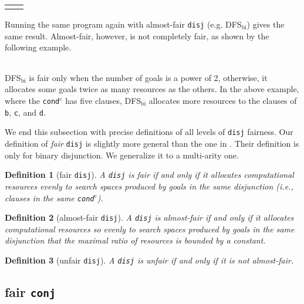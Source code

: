\documentclass[format=acmlarge, review=true, authordraft=true]{acmart}
\newcommand{\conde}{\texttt{cond$^e$}}
\newcommand{\disj}{\texttt{disj}}
\newcommand{\DFSbi}[0]{DFS$_\textrm{bi}$}
\newtheorem{defn}{Definition}[section]
\begin{document}
\begin{center}
	\begin{tabular}{l|r}
		 &
		
	\end{tabular}
\end{center}

Running the same program again with almost-fair \disj {} (e.g. 
\DFSbi{}) gives the same result. Almost-fair, however, is not 
completely fair, as shown by the following example. 

\begin{center}
	\begin{tabular}{c}
		
	\end{tabular}
\end{center}

\DFSbi{} is fair only when the number of goals is a power of 2, 
otherwise, it allocates some goals twice as many resources as the 
others. In the above example, where the \conde{} has five clauses, \DFSbi{} 
allocates more resources to the clauses of \texttt{b}, \texttt{c}, and 
\texttt{d}.

We end this subsection with precise definitions of all levels of 
\disj{} fairness. Our definition of \emph{fair} \disj{} is slightly 
more general
than the one in \citet{seres1999algebra}. Their definition is only
for binary disjunction. We generalize it to a multi-arity one.

\begin{defn}[fair \disj{}]
A \disj{} is fair if and only if it allocates computational resources evenly to 
search spaces produced by goals in the same disjunction 
(i.e., clauses in the same \conde).
\end{defn}

\begin{defn}[almost-fair \disj{}]
A \disj{} is almost-fair if and only if it allocates computational resources
so evenly to search spaces produced by goals in the same disjunction that 
the maximal ratio of resources is bounded by a constant.
\end{defn}

\begin{defn}[unfair \disj{}]
A \disj{} is unfair if and only if it is not almost-fair.
\end{defn}

\subsection{fair \texttt{conj}}
\label{sec:fairconj}
\end{document}
